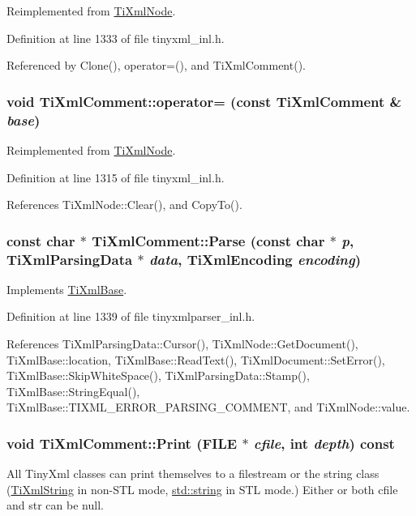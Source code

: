 Reimplemented from \hyperlink{class_ti_xml_node_ab6056978923ad8350fb5164af32d8038}{TiXmlNode}.

Definition at line 1333 of file tinyxml\_\-inl.h.

Referenced by Clone(), operator=(), and TiXmlComment().\hypertarget{class_ti_xml_comment_a46373f99b65cb960637dccb1f126bd49}{
\subsubsection[{operator=}]{\setlength{\rightskip}{0pt plus 5cm}void TiXmlComment::operator= (const {\bf TiXmlComment} \& {\em base})}}
\label{class_ti_xml_comment_a46373f99b65cb960637dccb1f126bd49}


Reimplemented from \hyperlink{class_ti_xml_node_a9eb62a8d95b8a98ec2df481cc9e5a7e2}{TiXmlNode}.

Definition at line 1315 of file tinyxml\_\-inl.h.

References TiXmlNode::Clear(), and CopyTo().\hypertarget{class_ti_xml_comment_a43bddc18ac057734b41d84653b71d3e0}{
\subsubsection[{Parse}]{\setlength{\rightskip}{0pt plus 5cm}const char $\ast$ TiXmlComment::Parse (const char $\ast$ {\em p}, \/  {\bf TiXmlParsingData} $\ast$ {\em data}, \/  {\bf TiXmlEncoding} {\em encoding})}}
\label{class_ti_xml_comment_a43bddc18ac057734b41d84653b71d3e0}


Implements \hyperlink{class_ti_xml_base_a00e4edb0219d00a1379c856e5a1d2025}{TiXmlBase}.

Definition at line 1339 of file tinyxmlparser\_\-inl.h.

References TiXmlParsingData::Cursor(), TiXmlNode::GetDocument(), TiXmlBase::location, TiXmlBase::ReadText(), TiXmlDocument::SetError(), TiXmlBase::SkipWhiteSpace(), TiXmlParsingData::Stamp(), TiXmlBase::StringEqual(), TiXmlBase::TIXML\_\-ERROR\_\-PARSING\_\-COMMENT, and TiXmlNode::value.\hypertarget{class_ti_xml_comment_a17398061d62c470f57801ce28fa33ad4}{
\subsubsection[{Print}]{\setlength{\rightskip}{0pt plus 5cm}void TiXmlComment::Print (FILE $\ast$ {\em cfile}, \/  int {\em depth}) const}}
\label{class_ti_xml_comment_a17398061d62c470f57801ce28fa33ad4}
All TinyXml classes can print themselves to a filestream or the string class (\hyperlink{class_ti_xml_string}{TiXmlString} in non-\/STL mode, \hyperlink{classstd_1_1string}{std::string} in STL mode.) Either or both cfile and str can be null.

